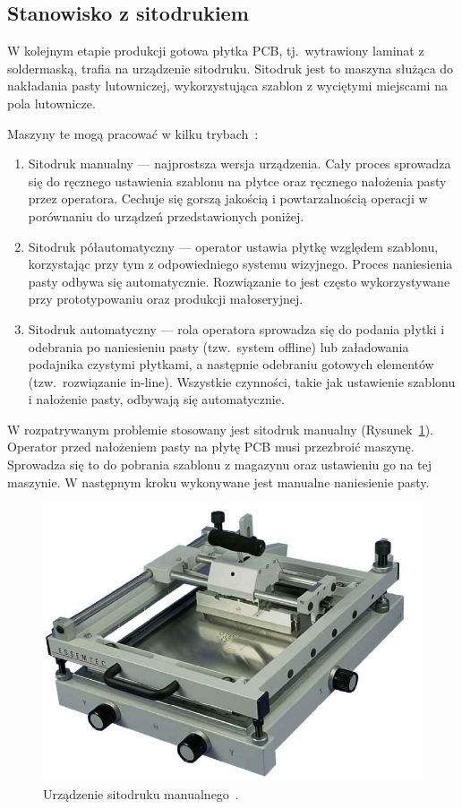 \subsection{Stanowisko z sitodrukiem}
W kolejnym etapie produkcji gotowa płytka PCB, tj.\ wytrawiony laminat z soldermaską, trafia na urządzenie sitodruku. Sitodruk jest to maszyna służąca do nakładania pasty lutowniczej, wykorzystująca szablon z wyciętymi miejscami na pola lutownicze.

\newpage{}
Maszyny te mogą pracować w kilku trybach~\cite{sitodruk}:
\begin{enumerate}
	\item Sitodruk manualny --- najprostsza wersja urządzenia. Cały proces sprowadza się do ręcznego ustawienia szablonu na płytce oraz ręcznego nałożenia pasty przez operatora. Cechuje się gorszą jakością i powtarzalnością operacji w porównaniu do urządzeń przedstawionych poniżej.
	\item Sitodruk półautomatyczny --- operator ustawia płytkę względem szablonu, korzystając przy tym z odpowiedniego systemu wizyjnego. Proces naniesienia pasty odbywa się automatycznie. Rozwiązanie to jest często wykorzystywane przy prototypowaniu oraz produkcji małoseryjnej.
	\item Sitodruk automatyczny --- rola operatora sprowadza się do podania płytki i odebrania po naniesieniu pasty (tzw.\ system offline) lub załadowania podajnika czystymi płytkami, a następnie odebraniu gotowych elementów (tzw.\ rozwiązanie in-line). Wszystkie czynności, takie jak ustawienie szablonu i nałożenie pasty, odbywają się automatycznie.
\end{enumerate}

W rozpatrywanym problemie stosowany jest sitodruk manualny (Rysunek~\ref{sitodruk}). Operator przed nałożeniem pasty na płytę PCB musi przezbroić maszynę. Sprowadza się to do pobrania szablonu z magazynu oraz ustawieniu go na tej maszynie. W następnym kroku wykonywane jest manualne naniesienie pasty.

\begin{figure}[H]
	\centering
	\includegraphics[scale=0.25]{./chapters/chapter2/sitodruk.jpg}
	\caption{Urządzenie sitodruku manualnego~\cite{sitodruk}.}
	\label{sitodruk}
\end{figure}


